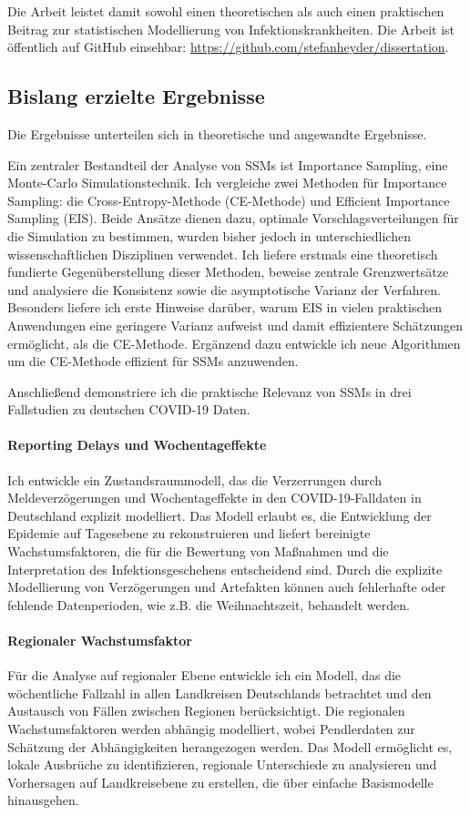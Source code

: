 \documentclass[a4paper,10pt]{article}
\begin{document}
Die Arbeit leistet damit sowohl einen theoretischen als auch einen praktischen Beitrag zur statistischen Modellierung von Infektionskrankheiten. Die Arbeit ist öffentlich auf GitHub einsehbar: \url{https://github.com/stefanheyder/dissertation}. 

\subsection*{Bislang erzielte Ergebnisse}
Die Ergebnisse unterteilen sich in theoretische und angewandte Ergebnisse.

Ein zentraler Bestandteil der Analyse von SSMs ist Importance Sampling, eine Monte-Carlo Simulationstechnik. 
Ich vergleiche zwei Methoden für Importance Sampling: die Cross-Entropy-Methode (CE-Methode) und Efficient Importance Sampling (EIS). Beide Ansätze dienen dazu, optimale Vorschlagsverteilungen für die Simulation zu bestimmen, wurden bisher jedoch in unterschiedlichen wissenschaftlichen Disziplinen verwendet. Ich liefere erstmals eine theoretisch fundierte Gegenüberstellung dieser Methoden, beweise zentrale Grenzwertsätze und analysiere die Konsistenz sowie die asymptotische Varianz der Verfahren. Besonders liefere ich erste Hinweise darüber, warum EIS in vielen praktischen Anwendungen eine geringere Varianz aufweist und damit effizientere Schätzungen ermöglicht, als die CE-Methode. Ergänzend dazu entwickle ich neue Algorithmen um die CE-Methode effizient für SSMs anzuwenden. 

Anschließend demonstriere ich die praktische Relevanz von SSMs in drei Fallstudien zu deutschen COVID-19 Daten.

\paragraph{Reporting Delays und Wochentageffekte}
Ich entwickle ein Zustandsraummodell, das die Verzerrungen durch Meldeverzögerungen und Wochentageffekte in den COVID-19-Falldaten in Deutschland explizit modelliert. Das Modell erlaubt es, die Entwicklung der Epidemie auf Tagesebene zu rekonstruieren und liefert bereinigte Wachstumsfaktoren, die für die Bewertung von Maßnahmen und die Interpretation des Infektionsgeschehens entscheidend sind. Durch die explizite Modellierung von Verzögerungen und Artefakten können auch fehlerhafte oder fehlende Datenperioden, wie z.B. die Weihnachtszeit,  behandelt werden.

\paragraph{Regionaler Wachstumsfaktor}
Für die Analyse auf regionaler Ebene entwickle ich ein Modell, das die wöchentliche Fallzahl in allen Landkreisen Deutschlands betrachtet und den Austausch von Fällen zwischen Regionen berücksichtigt. Die regionalen Wachstumsfaktoren werden abhängig modelliert, wobei Pendlerdaten zur Schätzung der Abhängigkeiten herangezogen werden. Das Modell ermöglicht es, lokale Ausbrüche zu identifizieren, regionale Unterschiede zu analysieren und Vorhersagen auf Landkreisebene zu erstellen, die über einfache Basismodelle hinausgehen.
\end{document}
